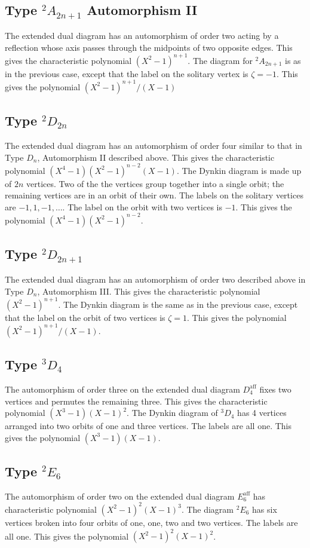 \documentclass{amsart}
\def\aff{\operatorname{aff}}
\begin{document}
\subsection{Type ${}^2A_{2n+1}$ Automorphism II}
The extended dual diagram has an automorphism of order two acting
by a reflection whose axis passes through the midpoints of two opposite
edges.  This gives the characteristic polynomial $(X^2-1)^{n+1}$.
The diagram for ${}^2A_{2n+1}$ is as in the previous case, except that
the label on the solitary vertex is $\zeta=-1$.  This gives the
polynomial $(X^2-1)^{n+1}/(X-1)$

\subsection{Type ${}^2D_{2n}$}
The extended dual diagram has an automorphism of order four similar
to that in Type $D_n$, Automorphism II described above.  This gives
the characteristic polynomial $(X^4-1)(X^2-1)^{n-2}(X-1)$.  The
Dynkin diagram is made up of $2n$ vertices.  Two of the the vertices group
together into a single orbit; the remaining vertices are in an orbit of
their own.  The labels on the solitary vertices are $-1,1,-1,\ldots$.
The label on the orbit with two vertices is $-1$.  This gives the
polynomial
$(X^4-1)(X^2-1)^{n-2}$.

\subsection{Type ${}^2D_{2n+1}$}
The extended dual diagram has an automorphism of order two described
above in Type $D_n$, Automorphism III.  This gives the characteristic
polynomial $(X^2-1)^{n+1}$.  The Dynkin diagram is the same as in the
previous case, except that the label on the orbit of two vertices is
$\zeta=1$.  This gives the polynomial
$(X^2-1)^{n+1}/(X-1)$.

\subsection{Type ${}^3D_4$}
The automorphism of order three on the extended dual 
diagram $D_4^{\aff}$ fixes
two vertices and permutes the remaining three.  This gives
the characteristic polynomial $(X^3-1)(X-1)^2$.  The Dynkin diagram
of ${}^3D_4$ has 4 vertices arranged into two orbits of one and three
vertices.  The labels are all one.  This gives the polynomial
$(X^3-1)(X-1)$.

\subsection{Type ${}^2E_6$}
The automorphism of order two on the extended dual diagram $E_6^{\aff}$
has characteristic polynomial $(X^2-1)^2(X-1)^3$.  The diagram
${}^2E_6$ has six vertices broken into four orbits of one, one, two and
two vertices.  The labels are all one.  This gives the polynomial
$(X^2-1)^2(X-1)^2$.
\end{document}
